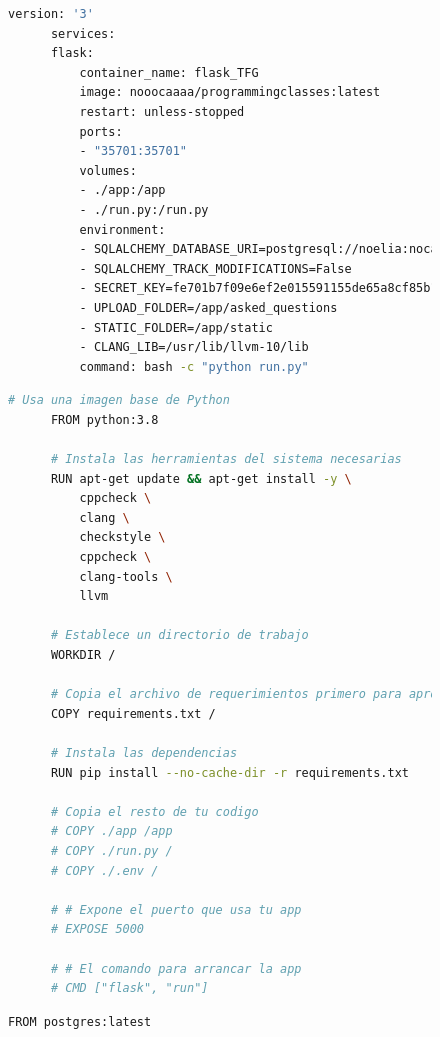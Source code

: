 \begin{appendices}
\begin{figure}[H]
    \centering
    \begin{lstlisting}[language=bash, caption={Docker-compose de prueba}, label=fig:dockercompose]
      version: '3'
      services:
      flask:
          container_name: flask_TFG
          image: nooocaaaa/programmingclasses:latest
          restart: unless-stopped
          ports:
          - "35701:35701"
          volumes:
          - ./app:/app
          - ./run.py:/run.py
          environment:
          - SQLALCHEMY_DATABASE_URI=postgresql://noelia:nocavi12@192.168.1.129:5432/mydatabase
          - SQLALCHEMY_TRACK_MODIFICATIONS=False
          - SECRET_KEY=fe701b7f09e6ef2e015591155de65a8cf85b160e6a75490a
          - UPLOAD_FOLDER=/app/asked_questions
          - STATIC_FOLDER=/app/static
          - CLANG_LIB=/usr/lib/llvm-10/lib
          command: bash -c "python run.py"
    \end{lstlisting}
\end{figure}
 
\begin{figure}[H]
    \centering
    \begin{lstlisting}[language=bash, caption={Dockerfile para la creación de la imagen de la app}, label=fig:dockerfileapp]
      # Usa una imagen base de Python
      FROM python:3.8
      
      # Instala las herramientas del sistema necesarias
      RUN apt-get update && apt-get install -y \
          cppcheck \
          clang \
          checkstyle \
          cppcheck \
          clang-tools \
          llvm 
      
      # Establece un directorio de trabajo
      WORKDIR /
      
      # Copia el archivo de requerimientos primero para aprovechar la cache de Docker
      COPY requirements.txt /
      
      # Instala las dependencias
      RUN pip install --no-cache-dir -r requirements.txt
      
      # Copia el resto de tu codigo
      # COPY ./app /app
      # COPY ./run.py /
      # COPY ./.env /
      
      # # Expone el puerto que usa tu app
      # EXPOSE 5000
      
      # # El comando para arrancar la app
      # CMD ["flask", "run"]
    \end{lstlisting}
  \end{figure}

  \begin{figure}[H]
    \centering
    \begin{lstlisting}[language=bash, caption={Dockerfile para la creación de la imagen de la base de datos}, label=fig:dockerfilebbdd]
      FROM postgres:latest
  

\end{lstlisting}
\end{figure}
\end{appendices}

